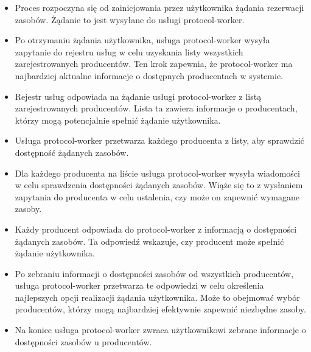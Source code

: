 \begin{itemize}
    \item Proces rozpoczyna się od zainicjowania przez użytkownika żądania rezerwacji zasobów. Żądanie to jest wysyłane do usługi  protocol-worker.
    \item Po otrzymaniu żądania użytkownika, usługa protocol-worker wysyła zapytanie do rejestru usług w celu uzyskania listy wszystkich zarejestrowanych producentów. Ten krok zapewnia, że protocol-worker ma najbardziej aktualne informacje o dostępnych producentach w systemie.
    \item Rejestr usług odpowiada na żądanie usługi protocol-worker z listą zarejestrowanych producentów. Lista ta zawiera informacje o producentach, którzy mogą potencjalnie spełnić żądanie użytkownika.
    \item Usługa protocol-worker przetwarza każdego producenta z listy, aby sprawdzić dostępność żądanych zasobów.
    \item Dla każdego producenta na liście usługa protocol-worker wysyła wiadomości w celu sprawdzenia dostępności żądanych zasobów. Wiąże się to z wysłaniem zapytania do producenta w celu ustalenia, czy może on zapewnić wymagane zasoby.
    \item Każdy producent odpowiada do protocol-worker z informacją o dostępności żądanych zasobów. Ta odpowiedź wskazuje, czy producent może spełnić żądanie użytkownika.
    \item Po zebraniu informacji o dostępności zasobów od wszystkich producentów, usługa protocol-worker przetwarza te odpowiedzi w celu określenia najlepszych opcji realizacji żądania użytkownika. Może to obejmować wybór producentów, którzy mogą najbardziej efektywnie zapewnić niezbędne zasoby.
    \item Na koniec usługa protocol-worker zwraca użytkownikowi zebrane informacje o dostępności zasobów u producentów.
\end{itemize}

